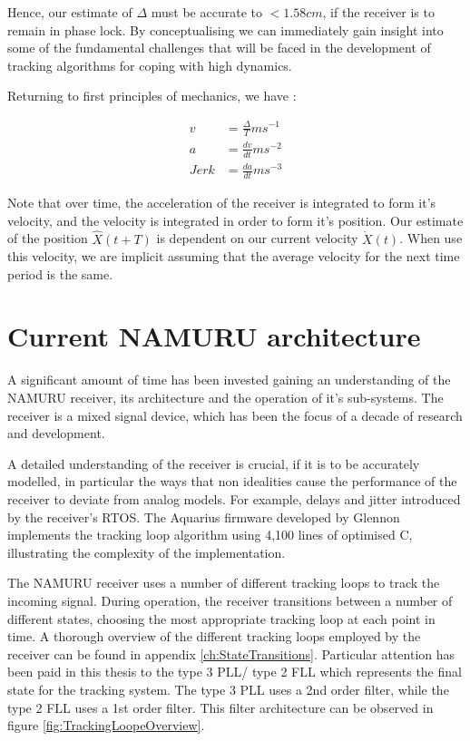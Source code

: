 Hence, our estimate of $\Delta$ must be accurate to $< 1.58cm$, if the receiver is to remain in phase lock. By conceptualising we can immediately gain insight into some of the fundamental challenges that will be faced in the development of tracking algorithms for coping with high dynamics.



Returning to first principles of mechanics, we have \cite{salas1999etgen} : 

\begin{align}
v & = \frac{\Delta}{T} m s^{-1} \\
a & = \frac{dv}{dt} m s^{-2} \\
Jerk & = \frac{da}{dt} m s^{-3}
\end{align}

Note that over time, the acceleration of the receiver is integrated to form it's velocity, and the velocity is integrated in order to form it's position. Our estimate of the position $\hat{X}(t+T)$ is dependent on our current velocity $\dot{X}(t)$. When use this velocity, we are implicit assuming that the average velocity for the next time period is the same. 


\section{Current \ac{NAMURU} architecture}
A significant amount of time has been invested gaining an understanding of the \ac{NAMURU} receiver, its architecture and the operation of it's sub-systems. The receiver is a mixed signal device, which has been the focus of a decade of research and development. 

A detailed understanding of the receiver is crucial, if it is to be accurately modelled, in particular the ways that non idealities cause the performance of the receiver to deviate from analog models. For example, delays and jitter introduced  by the receiver's \ac{RTOS}. The Aquarius firmware developed by Glennon \cite{Glennon11aquariusfirmware} implements the tracking loop algorithm using 4,100 lines of optimised C, illustrating the complexity of the implementation.

The \ac{NAMURU} receiver uses a number of different tracking loops to track the incoming signal. During operation, the receiver transitions between a number of different states, choosing the most appropriate tracking loop at each point in time. A thorough overview of the different tracking loops employed by the receiver can be found in appendix \ref{ch:StateTransitions}. Particular attention has been paid in this thesis to the type 3 PLL/ type 2 FLL which represents the final state for the tracking system. The type 3 PLL uses a 2nd order filter, while the type 2 FLL uses a 1st order filter. This filter architecture can be observed in figure \ref{fig:TrackingLoopeOverview}. 


